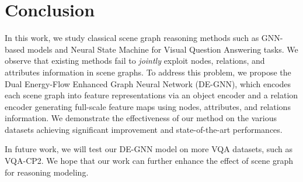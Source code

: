 \documentclass[letterpaper]{article} %
\begin{document}
\section{Conclusion}
In this work, we study classical scene graph reasoning methods such as GNN-based models and Neural State Machine for Visual Question Answering tasks. 
We observe that existing methods fail to \emph{jointly} exploit nodes, relations, and attributes information in scene graphs. 
To address this problem, we propose the Dual Energy-Flow Enhanced Graph Neural Network (DE-GNN), which encodes each scene graph into feature representations via an object encoder and a relation encoder generating full-scale feature maps using nodes, attributes, and relations information. 
We demonstrate the effectiveness of our method on the various datasets achieving significant improvement and state-of-the-art performances.

In future work, we will test our DE-GNN model on more VQA datasets, such as VQA-CP2. 
We hope that our work can further enhance the effect of scene graph for reasoning modeling.


\newpage


\clearpage

\end{document}
